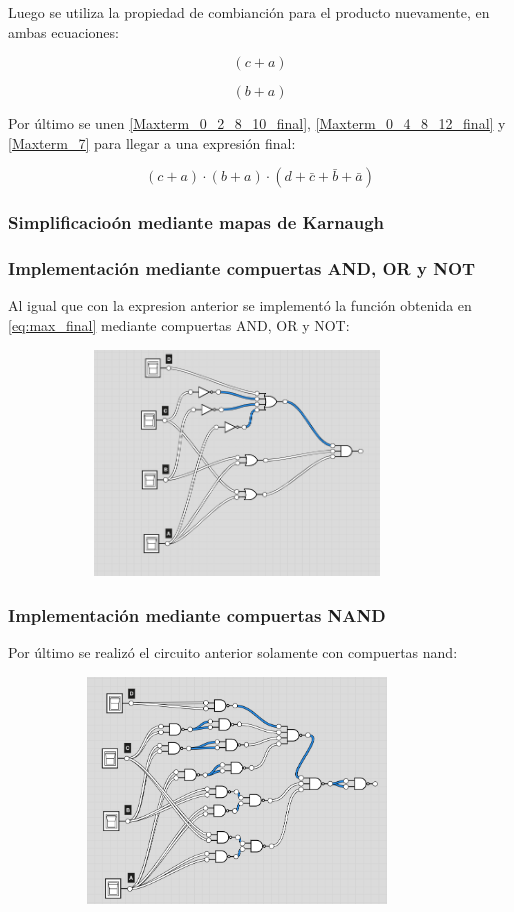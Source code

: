 Luego se utiliza la propiedad de combianción para el producto nuevamente, en ambas ecuaciones:

\begin{equation}\label{Maxterm_0_2_8_10_final}
(c + a) 
\end{equation}

\begin{equation}\label{Maxterm_0_4_8_12_final}
(b +a)
\end{equation}

Por último se unen \ref{Maxterm_0_2_8_10_final}, \ref{Maxterm_0_4_8_12_final} y \ref{Maxterm_7} para llegar a una expresión final:

\begin{equation}\label{eq:max_final}
\boxed{(c + a) \cdot (b +a) \cdot (d + \bar{c} + \bar{b} + \bar{a})}
\end{equation}

\subsubsection{Simplificacioón mediante mapas de Karnaugh}


\subsubsection{Implementación mediante compuertas AND, OR y NOT}

Al igual que con la expresion anterior se implementó la función obtenida en \ref{eq:max_final} mediante compuertas AND, OR y NOT:

\begin{figure}[H]
\centering
\includegraphics[width=10cm,height=6cm]{Ejercicio_2/circuitos/Ej2_parte2_logily.png}
\end{figure}

\subsubsection{Implementación mediante compuertas NAND}
Por último se realizó el circuito anterior solamente con compuertas nand:
\begin{figure}[H]
\centering
\includegraphics[width=10cm,height=6cm]{Ejercicio_2/circuitos/Ej2_parte2_nand_logicly.png}
\end{figure}

%